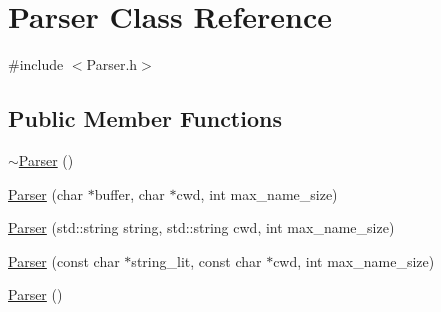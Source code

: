 \hypertarget{class_parser}{}\section{Parser Class Reference}
\label{class_parser}


{\ttfamily \#include $<$Parser.\+h$>$}

\subsection*{Public Member Functions}
\begin{DoxyCompactItemize}
\item 
\mbox{\hyperlink{class_parser_a3e658b5917a93a3ef648050d060e3a93}{$\sim$\+Parser}} ()
\end{DoxyCompactItemize}
\textbf{ }\par
\begin{DoxyCompactItemize}
\item 
\mbox{\hyperlink{class_parser_a306c6c33d7a6cf1bb682be360fcfe982}{Parser}} (char $\ast$buffer, char $\ast$cwd, int max\+\_\+name\+\_\+size)
\item 
\mbox{\hyperlink{class_parser_ada33680bf5f723ef95c44eeed1bff451}{Parser}} (std\+::string string, std\+::string cwd, int max\+\_\+name\+\_\+size)
\item 
\mbox{\hyperlink{class_parser_a5168f5c44e9649e71796f9bef48bdbbe}{Parser}} (const char $\ast$string\+\_\+lit, const char $\ast$cwd, int max\+\_\+name\+\_\+size)
\item 
\mbox{\hyperlink{class_parser_a12234f6cd36b61af4b50c94a179422c1}{Parser}} ()
\end{DoxyCompactItemize}


